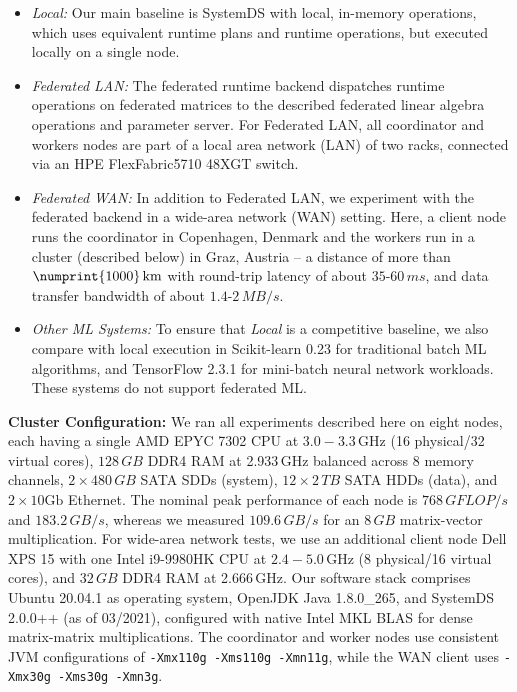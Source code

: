\documentclass[sigconf,screen]{acmart}
\newcommand{\num}[1]{\numprint{#1}}
\newcommand{\ms}{\unit{\,ms}}
\newcommand{\gb}{\unit{\,GB}}
\newcommand{\tb}{\unit{\,TB}}
\newcommand{\mbs}{\unit{\,MB/s}} %
\newcommand{\gbs}{\unit{\,GB/s}} %
\newcommand{\gflops}{\unit{\,GFLOP/s}} %
\begin{document}
\begin{itemize}
\item \emph{Local:} Our main baseline is SystemDS with local, in-memory operations, which uses equivalent runtime plans and runtime operations, but executed locally on a single node.
\item \emph{Federated LAN:} The federated runtime backend dispatches runtime operations on federated matrices to the described federated linear algebra operations and parameter server. For Federated LAN, all coordinator and workers nodes are part of a local area network (LAN) of two racks, connected via an HPE FlexFabric5710 48XGT switch.
\item \emph{Federated WAN:} In addition to Federated LAN, we experiment with the federated backend in a wide-area network (WAN) setting. Here, a client node runs the coordinator in Copenhagen, Denmark and the workers run in a cluster (described below) in Graz, Austria -- a distance of more than $\num{1000}\,\text{km}$ with round-trip latency of about $35$-$60\ms$, and data transfer bandwidth of about $1.4$-$2\mbs$.
\item \emph{Other ML Systems:} To ensure that \emph{Local} is a competitive baseline, we also compare with local execution in Scikit-learn 0.23 \cite{PedregosaVGMTGBPWDVPCBPD11} for traditional batch ML algorithms, and TensorFlow 2.3.1 \cite{AbadiBCCDDDGIIK16} for mini-batch neural network workloads. These systems do not support federated ML. %
\end{itemize}

\textbf{Cluster Configuration:} We ran all experiments described here on eight nodes, each having a single AMD EPYC 7302 CPU at $3.0{-}3.3$\,GHz (16 physical/32 virtual cores), $128\gb$ DDR4 RAM at 2.933\,GHz balanced across 8 memory channels, $2\times 480\gb$ SATA SDDs (system), $12\times 2\tb$ SATA HDDs (data), and $2\times 10\text{Gb}$ Ethernet. The nominal peak performance of each node is $768\gflops$ and $183.2\gbs$, whereas we measured $109.6\gbs$ for an $8\gb$ matrix-vector multiplication. For wide-area network tests, we use an additional client node Dell XPS 15 with one Intel i9-9980HK CPU at $2.4{-}5.0$\,GHz (8 physical/16 virtual cores), and $32\gb$ DDR4 RAM at 2.666\,GHz. Our software stack comprises Ubuntu 20.04.1 as operating system, OpenJDK Java 1.8.0\_265, and SystemDS 2.0.0++ (as of 03/2021), configured with native Intel MKL BLAS for dense matrix-matrix multiplications. The coordinator and worker nodes use consistent JVM configurations of \texttt{-Xmx110g -Xms110g -Xmn11g}, while the WAN client uses \texttt{-Xmx30g -Xms30g -Xmn3g}. 
\end{document}

